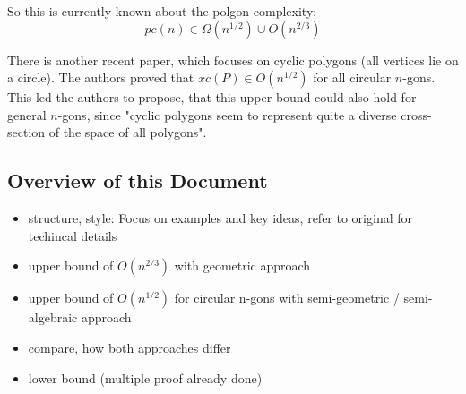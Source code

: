 So this is currently known about the polgon complexity:
$$pc(n) \in \Omega(n^{1/2}) \cup O(n^{2/3})$$

There is another recent paper, which focuses on cyclic polygons (all vertices lie on a circle). The authors proved that $xc(P) \in O(n^{1/2})$ for all circular $n$-gons. 
This led the authors to propose, that this upper bound could also hold for general $n$-gons, since "cyclic polygons seem to represent quite a diverse cross-section of the space of all polygons".

\subsection{Overview of this Document}
\begin{itemize}
  \item structure, style: Focus on examples and key ideas, refer to original for techincal details
  \item upper bound of $O(n^{2/3})$ with geometric approach
  \item upper bound of $O(n^{1/2})$ for circular n-gons with semi-geometric / semi-algebraic approach
  \item compare, how both approaches differ
  \item lower bound (multiple proof already done)
\end{itemize}
